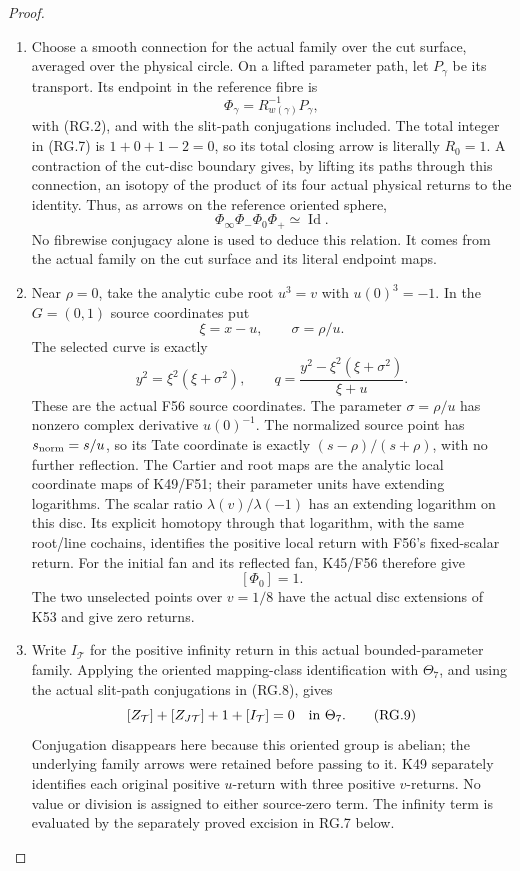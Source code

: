 \begin{proof}
\begin{enumerate}[label=\arabic*.]
\item Choose a smooth connection for the actual family over the
cut surface, averaged over the physical circle. On a lifted
parameter path, let \(P_\gamma\) be its transport. Its endpoint
in the reference fibre is
\[
             \Phi_\gamma=R_{w(\gamma)}^{-1}P_\gamma,
\]
with (RG.2), and with the slit-path conjugations included.
The total integer in (RG.7) is \(1+0+1-2=0\), so its total
closing arrow is literally \(R_0=1\). A contraction of the
cut-disc boundary gives, by lifting its paths through this
connection, an isotopy of the product of its four actual
physical returns to the identity. Thus, as arrows on the
reference oriented sphere,
\[
       \Phi_\infty\Phi_-\Phi_0\Phi_+\simeq\operatorname{Id}.
                                                               \tag{RG.8}
\]
No fibrewise conjugacy alone is used to deduce this relation.
It comes from the actual family on the cut surface and its
literal endpoint maps.

\item Near \(\rho=0\), take the analytic cube root \(u^3=v\) with
\(u(0)^3=-1\). In the \(G=(0,1)\) source coordinates put
\[
 \xi=x-u,\qquad \sigma=\rho/u.
\]
The selected curve is exactly
\[
 y^2=\xi^2(\xi+\sigma^2),\qquad
 q=\frac{y^2-\xi^2(\xi+\sigma^2)}{\xi+u}.
\]
These are the actual F56 source coordinates. The parameter
\(\sigma=\rho/u\) has nonzero complex derivative \(u(0)^{-1}\).
The normalized source point has
\(s_{\rm norm}=s/u\), so its Tate coordinate is exactly
\((s-\rho)/(s+\rho)\), with no further reflection. The
Cartier and root maps are the analytic local coordinate maps
of K49/F51; their parameter units have extending logarithms.
The scalar ratio
\(\lambda(v)/\lambda(-1)\) has an extending logarithm on this
disc. Its explicit homotopy through that logarithm, with the
same root/line cochains, identifies the positive local return
with F56's fixed-scalar return. For the initial fan and its
reflected fan, K45/F56 therefore give
\[
                         [\Phi_0]=1.
\]
The two unselected points over \(v=1/8\) have the actual
disc extensions of K53 and give zero returns.

\item Write \(I_{\mathcal T}\) for the positive infinity return in
this actual bounded-parameter family. Applying the oriented
mapping-class identification with \(\Theta_7\), and using the
actual slit-path conjugations in (RG.8), gives
\[
 [Z_{\mathcal T}]+[Z_{J\mathcal T}]+1+[I_{\mathcal T}]
                  =0\quad\hbox{in }\Theta_7.          \tag{RG.9}
\]
Conjugation disappears here because this oriented group is
abelian; the underlying family arrows were retained before
passing to it. K49 separately identifies each original
positive \(u\)-return with three positive \(v\)-returns.
No value or division is assigned to either source-zero term.
The infinity term is evaluated by the separately proved excision
in RG.7 below.


\end{enumerate}
\end{proof}
